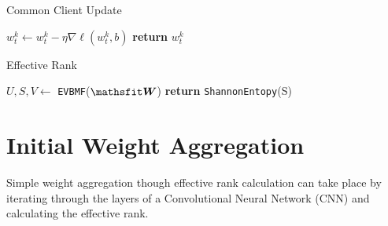 \begin{algorithm}
\caption{Common Client Update}\label{alg:clientupdate}
\begin{algorithmic}[1]
            \State $w_t^k \leftarrow w_t^k - \eta \nabla \ell(w_t^k, b)$
        \EndFor
    \EndFor
    \State \textbf{return} $w_t^k$
\EndFunction
\end{algorithmic}
\end{algorithm}

\begin{algorithm}
\caption{Effective Rank}\label{alg:effectiverank}
\begin{algorithmic}[1]
    \State $U, S, V \leftarrow$ \texttt{EVBMF}($\tW$) 
    \State \textbf{return} \texttt{ShannonEntopy}(S)
\EndFunction
\end{algorithmic}
\end{algorithm}

\newpage
\section{Initial Weight Aggregation}\label{sec:initmethod}
Simple weight aggregation though effective rank calculation can take place by iterating through the layers of a Convolutional Neural Network (CNN) and calculating the effective rank. 

